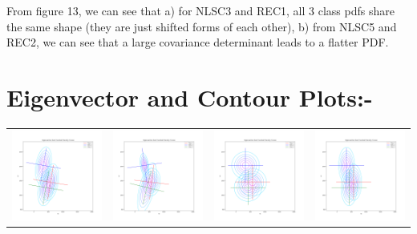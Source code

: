 \documentclass[11pt]{article}
\begin{document}
 From figure 13, we can see that a) for NLSC3 and REC1, all 3 class pdfs share the same shape (they are just shifted forms of each other), b) from NLSC5 and REC2, we can see that a large covariance determinant leads to a flatter PDF.
 
\section*{Eigenvector and Contour Plots:-}

\begin{center}
  \setlength\tabcolsep{-4pt}
  \begin{tabular}{cccc}
  \includegraphics[width=4.5cm]{classifier/REAL_plots/EigenvectorContour_Case1.png}
  & \includegraphics[width=4.5cm]{classifier/REAL_plots/EigenvectorContour_Case2.png}
  & \includegraphics[width=4.5cm]{classifier/REAL_plots/EigenvectorContour_Case3.png}
  & \includegraphics[width=4.5cm]{classifier/REAL_plots/EigenvectorContour_Case4.png} \\

\end{tabular}
\end{center}
\end{document}

